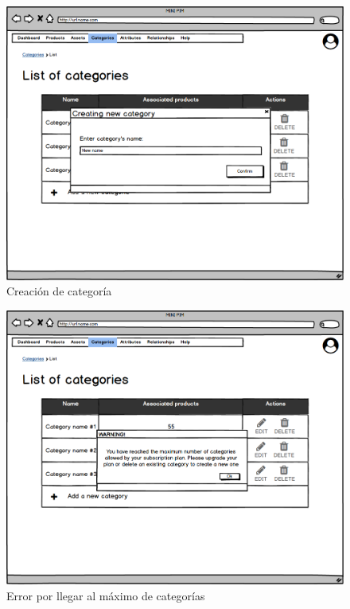 \vspace{0.20cm}

\begin{figure}[H]
    \includegraphics[width=1\linewidth]{mockups/RF4.1_1.png}
    \caption{Creación de categoría}
   \end{figure}
\vspace{1.0cm}

\begin{figure}[H]
    \includegraphics[width=1\linewidth]{mockups/RF4.1_2.png}
    \caption{Error por llegar al máximo de categorías}
   \end{figure}
\vspace{1.0cm}

